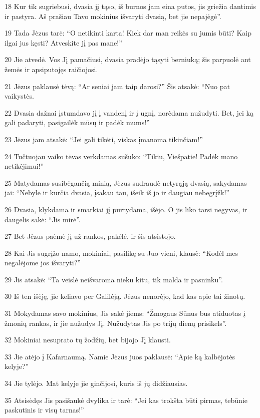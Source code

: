 \par 18 Kur tik sugriebusi, dvasia jį tąso, iš burnos jam eina putos, jis griežia dantimis ir pastyra. Aš prašiau Tavo mokinius išvaryti dvasią, bet jie nepajėgė”. 
\par 19 Tada Jėzus tarė: “O netikinti karta! Kiek dar man reikės su jumis būti? Kaip ilgai jus kęsti? Atveskite jį pas mane!” 
\par 20 Jie atvedė. Vos Jį pamačiusi, dvasia pradėjo tąsyti berniuką; šis parpuolė ant žemės ir apsiputojęs raičiojosi. 
\par 21 Jėzus paklausė tėvą: “Ar seniai jam taip darosi?” Šis atsakė: “Nuo pat vaikystės. 
\par 22 Dvasia dažnai įstumdavo jį į vandenį ir į ugnį, norėdama nužudyti. Bet, jei ką gali padaryti, pasigailėk mūsų ir padėk mums!” 
\par 23 Jėzus jam atsakė: “Jei gali tikėti, viskas įmanoma tikinčiam!” 
\par 24 Tučtuojau vaiko tėvas verkdamas sušuko: “Tikiu, Viešpatie! Padėk mano netikėjimui!” 
\par 25 Matydamas susibėgančią minią, Jėzus sudraudė netyrąją dvasią, sakydamas jai: “Nebyle ir kurčia dvasia, įsakau tau, išeik iš jo ir daugiau nebegrįžk!” 
\par 26 Dvasia, klykdama ir smarkiai jį purtydama, išėjo. O jis liko tarsi negyvas, ir daugelis sakė: “Jis mirė”. 
\par 27 Bet Jėzus paėmė jį už rankos, pakėlė, ir šis atsistojo. 
\par 28 Kai Jis sugrįžo namo, mokiniai, pasilikę su Juo vieni, klausė: “Kodėl mes negalėjome jos išvaryti?” 
\par 29 Jis atsakė: “Ta veislė neišvaroma nieku kitu, tik malda ir pasninku”. 
\par 30 Iš ten išėję, jie keliavo per Galilėją. Jėzus nenorėjo, kad kas apie tai žinotų. 
\par 31 Mokydamas savo mokinius, Jis sakė jiems: “Žmogaus Sūnus bus atiduotas į žmonių rankas, ir jie nužudys Jį. Nužudytas Jis po trijų dienų prisikels”. 
\par 32 Mokiniai nesuprato tų žodžių, bet bijojo Jį klausti. 
\par 33 Jie atėjo į Kafarnaumą. Namie Jėzus juos paklausė: “Apie ką kalbėjotės kelyje?” 
\par 34 Jie tylėjo. Mat kelyje jie ginčijosi, kuris iš jų didžiausias. 
\par 35 Atsisėdęs Jis pasišaukė dvylika ir tarė: “Jei kas trokšta būti pirmas, tebūnie paskutinis ir visų tarnas!” 
